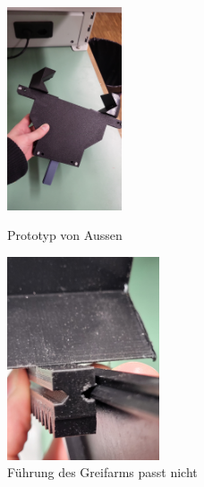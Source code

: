 \documentclass[../main.tex]{subfiles}
\begin{document}
\begin{figure}[h!]
    \centering
    \begin{minipage}[t]{0.45\textwidth}
        \centering
        \includegraphics[height=6cm]{img/greifarmtest/prototyp_test_fertig.jpeg}
        \caption{Prototyp von Aussen}
        \label{fig:hardware_test_fertig}
    \end{minipage}%
    \hfill
    \begin{minipage}[t]{0.45\textwidth}
        \centering
        \includegraphics[height=6cm]{img/greifarmtest/prototyp_test_klemmen_gleiten.jpeg}
        \caption{Führung des Greifarms passt nicht}
        \label{fig:hardware_test_klemmen_gleiten}
    \end{minipage}
\end{figure}
\newpage
\end{document}
